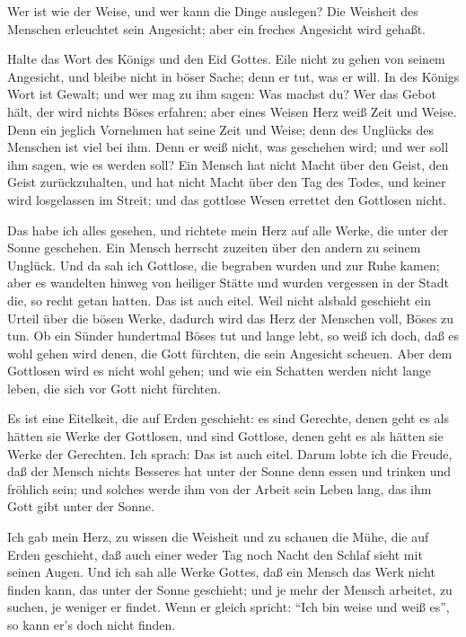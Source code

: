  Wer ist wie der Weise, und wer kann die Dinge auslegen? Die
Weisheit des Menschen erleuchtet sein Angesicht; aber ein freches
Angesicht wird gehaßt.

 Halte das Wort des Königs und den Eid Gottes. 
Eile nicht zu gehen von seinem Angesicht, und bleibe nicht in böser
Sache; denn er tut, was er will.  In des Königs Wort ist
Gewalt; und wer mag zu ihm sagen: Was machst du?  Wer das
Gebot hält, der wird nichts Böses erfahren; aber eines Weisen Herz weiß
Zeit und Weise.  Denn ein jeglich Vornehmen hat seine Zeit
und Weise; denn des Unglücks des Menschen ist viel bei ihm. 
Denn er weiß nicht, was geschehen wird; und wer soll ihm sagen, wie es
werden soll?  Ein Mensch hat nicht Macht über den Geist, den
Geist zurückzuhalten, und hat nicht Macht über den Tag des Todes, und
keiner wird losgelassen im Streit; und das gottlose Wesen errettet den
Gottlosen nicht.

 Das habe ich alles gesehen, und richtete mein Herz auf alle
Werke, die unter der Sonne geschehen. Ein Mensch herrscht zuzeiten über
den andern zu seinem Unglück.  Und da sah ich Gottlose, die
begraben wurden und zur Ruhe kamen; aber es wandelten hinweg von
heiliger Stätte und wurden vergessen in der Stadt die, so recht getan
hatten. Das ist auch eitel.  Weil nicht alsbald geschieht
ein Urteil über die bösen Werke, dadurch wird das Herz der Menschen
voll, Böses zu tun.  Ob ein Sünder hundertmal Böses tut und
lange lebt, so weiß ich doch, daß es wohl gehen wird denen, die Gott
fürchten, die sein Angesicht scheuen.  Aber dem Gottlosen
wird es nicht wohl gehen; und wie ein Schatten werden nicht lange leben,
die sich vor Gott nicht fürchten.

 Es ist eine Eitelkeit, die auf Erden geschieht: es sind
Gerechte, denen geht es als hätten sie Werke der Gottlosen, und sind
Gottlose, denen geht es als hätten sie Werke der Gerechten. Ich sprach:
Das ist auch eitel.  Darum lobte ich die Freude, daß der
Mensch nichts Besseres hat unter der Sonne denn essen und trinken und
fröhlich sein; und solches werde ihm von der Arbeit sein Leben lang, das
ihm Gott gibt unter der Sonne.

 Ich gab mein Herz, zu wissen die Weisheit und zu schauen
die Mühe, die auf Erden geschieht, daß auch einer weder Tag noch Nacht
den Schlaf sieht mit seinen Augen.  Und ich sah alle Werke
Gottes, daß ein Mensch das Werk nicht finden kann, das unter der Sonne
geschieht; und je mehr der Mensch arbeitet, zu suchen, je weniger er
findet. Wenn er gleich spricht: ``Ich bin weise und weiß es'', so kann
er's doch nicht finden.

